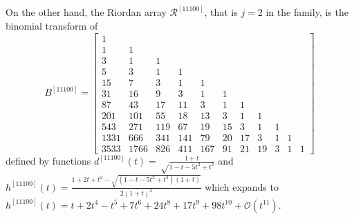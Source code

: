 On the other hand, the Riordan array $\mathcal{R}^{[11100]}$, that is $j=2$ in
the family, is the binomial transform of
\begin{displaymath}
B^{[11100]} =\left[\begin{array}{ccccccccccc}1 &  &  &  &  &  &  &  &  &  & \\1 & 1 &  &  &  &  &  &  &  &  & \\3 & 1 & 1 &  &  &  &  &  &  &  & \\5 & 3 & 1 & 1 &  &  &  &  &  &  & \\15 & 7 & 3 & 1 & 1 &  &  &  &  &  & \\31 & 16 & 9 & 3 & 1 & 1 &  &  &  &  & \\87 & 43 & 17 & 11 & 3 & 1 & 1 &  &  &  & \\201 & 101 & 55 & 18 & 13 & 3 & 1 & 1 &  &  & \\543 & 271 & 119 & 67 & 19 & 15 & 3 & 1 & 1 &  & \\1331 & 666 & 341 & 141 & 79 & 20 & 17 & 3 & 1 & 1 & \\3533 & 1766 & 826 & 411 & 167 & 91 & 21 & 19 & 3 & 1 & 1\end{array}\right]
\end{displaymath}
defined by functions $d^{[11100]}(t)=\sqrt\frac{1+t}{1-t-5t^{2}+t^{3}}$ and
$h^{[11100]}(t)=\frac{1+2t+t^{2}-\sqrt{(1-t-5t^{2}+t^{3})(1+t)}}{2(1+t)^{2}}$
which expands to $h^{[11100]}(t)=t + 2 t^{4} - t^{5} + 7 t^{6} + 24 t^{8} + 17 t^{9} + 98 t^{10} +
\mathcal{O}\left(t^{11}\right)$.

\iffalse
Furthermore, the Riordan array $\mathcal{R}^{[1111000]}$, that is $j=3$ in the
family, is the binomial transform of
\begin{displaymath}
B^{[1111000]} =\left[\begin{array}{ccccccccccc}1 &  &  &  &  &  &  &  &  &  & \\1 & 1 &  &  &  &  &  &  &  &  & \\3 & 1 & 1 &  &  &  &  &  &  &  & \\7 & 4 & 1 & 1 &  &  &  &  &  &  & \\17 & 8 & 5 & 1 & 1 &  &  &  &  &  & \\49 & 25 & 9 & 6 & 1 & 1 &  &  &  &  & \\123 & 61 & 34 & 10 & 7 & 1 & 1 &  &  &  & \\351 & 176 & 74 & 44 & 11 & 8 & 1 & 1 &  &  & \\945 & 472 & 242 & 88 & 55 & 12 & 9 & 1 & 1 &  & \\2641 & 1321 & 610 & 322 & 103 & 67 & 13 & 10 & 1 & 1 & \\7363 & 3681 & 1811 & 766 & 417 & 119 & 80 & 14 & 11 & 1 & 1\end{array}\right]
\end{displaymath}
\fi

